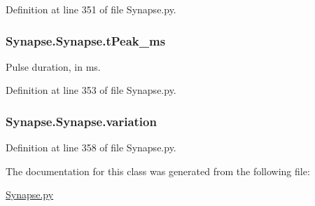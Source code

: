 Definition at line 351 of file Synapse.\+py.

\subsubsection[{\texorpdfstring{t\+Peak\+\_\+ms}{tPeak_ms}}]{\setlength{\rightskip}{0pt plus 5cm}Synapse.\+Synapse.\+t\+Peak\+\_\+ms}\hypertarget{class_synapse_1_1_synapse_a09b9b092efcb0d6745fa32fadcd46375}{}\label{class_synapse_1_1_synapse_a09b9b092efcb0d6745fa32fadcd46375}


Pulse duration, in ms. 



Definition at line 353 of file Synapse.\+py.

\subsubsection[{\texorpdfstring{variation}{variation}}]{\setlength{\rightskip}{0pt plus 5cm}Synapse.\+Synapse.\+variation}\hypertarget{class_synapse_1_1_synapse_aa37e9a9bbac9358b50ba5280439ad319}{}\label{class_synapse_1_1_synapse_aa37e9a9bbac9358b50ba5280439ad319}


Definition at line 358 of file Synapse.\+py.



The documentation for this class was generated from the following file\+:\begin{DoxyCompactItemize}
\item 
\hyperlink{_synapse_8py}{Synapse.\+py}\end{DoxyCompactItemize}

